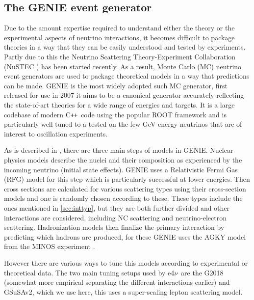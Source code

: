\documentclass[a4paper,12pt]{article}
\newcommand{\efn}{e4$\nu$}
\newcommand{\CC}{C\texttt{++}}
\begin{document}
\subsection{The GENIE event generator \cite{andreopoulosGENIENeutrinoMonte2010}}\label{sec:genie}
Due to the amount expertise required to understand either the theory or the experimental aspects of neutrino interactions, it becomes difficult to package theories in a way that they can be easily understood and tested by experiments.
Partly due to this the Neutrino Scattering Theory-Experiment Collaboration (NuSTEC \cite{alvarez-rusoNuSTEC11NeutrinoScattering2018}) has been started recently.
As a result, Monte Carlo (MC) neutrino event generators are used to package theoretical models in a way that predictions can be made.
GENIE is the most widely adopted such MC generator, first released for use in 2007 it aims to be a canonical generator accurately reflecting the state-of-art theories for a wide range of energies and targets.
It is a large codebase of modern \CC\ code using the popular ROOT framework\cite{brunROOTObjectOriented1997} and is particularly well tuned to a tested on the few \si{GeV} energy neutrinos that are of interest to oscillation experiments.

As is described in \cite{andreopoulosGENIENeutrinoMonte2010,andreopoulosGENIENeutrinoMonte2015}, there are three main steps of models in GENIE.
Nuclear physics models describe the nuclei and their composition as experienced by the incoming neutrino (initial state effects).
GENIE uses a Relativistic Fermi Gas (RFG) model for this step which is particularly successful at lower energies.
Then cross sections are calculated for various scattering types using their cross-section models and one is randomly chosen according to these.
These types include the ones mentioned in \cref{sec:inttyp}, but they are both further divided and other interactions are considered, including NC scattering and neutrino-electron scattering.
Hadronization models then finalize the primary interaction by predicting which hadrons are produced, for these GENIE uses the AGKY model from the MINOS experiment \cite{yangHadronizationModelMINOS2007}.

However there are various ways to tune this models according to experimental or theoretical data.
The two main tuning setups used by \efn\ are the G2018 (somewhat more empirical separating the different interactions earlier) and GSuSAv2, which we use here, this uses a super-scaling lepton scattering model\cite{amaroNeutrinonucleusScatteringSuSA2021}.
\end{document}

